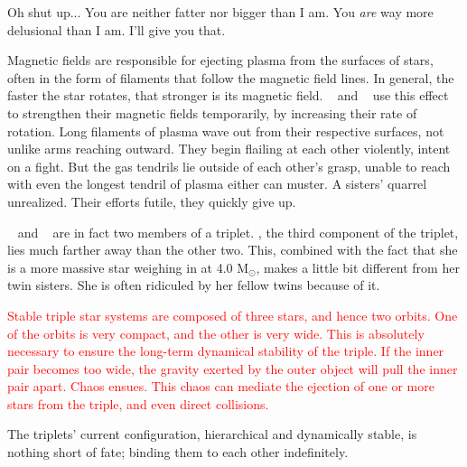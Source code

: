 \documentclass[main.tex]{subfiles}
\begin{document}
\begin{tcolorbox}[sharp corners, colback=green!30, colframe=green!80!blue, title=Stefan-Boltzmann Law]
\par \textcolor{green} {}
\end{tcolorbox}

\par \Alcyone Oh shut up...  You are neither fatter nor bigger than I am.  You \textit{are} way more delusional than I am.  I'll give you that.

\par \nar Magnetic fields are responsible for ejecting plasma from the surfaces of stars, often in the form of filaments that follow the magnetic field lines.  In general, the faster the star rotates, that stronger is its magnetic field.  \rmtaygete~ and \rmalcyone~ use this effect to strengthen their magnetic fields temporarily, by increasing their rate of rotation.  Long filaments of plasma wave out from their respective surfaces, not unlike arms reaching outward.  They begin flailing at each other violently, intent on a fight.  But the gas tendrils lie outside of each other's grasp, unable to reach with even the longest tendril of plasma either can muster.  A sisters' quarrel unrealized.  Their efforts futile, they quickly give up.  

\par \nar \rmtaygete~ and \rmalcyone~ are in fact two members of a triplet.  \rmcelaeno, the third component of the triplet, lies much farther away than the other two.  This, combined with the fact that she is a more massive star weighing in at 4.0 M$_{\odot}$, makes \rmcelaeno a little bit different from her twin sisters.  She is often ridiculed by her fellow twins because of it.

\begin{tcolorbox}[sharp corners, colback=red!30, colframe=red!80!blue, title=Dynamical Stability]
\par \textcolor{red} {Stable triple star systems are composed of three stars, and hence two orbits.  One of the orbits is very compact, and the other is very wide.  This is absolutely necessary to ensure the long-term dynamical stability of the triple.  If the inner pair becomes too wide, the gravity exerted by the outer object will pull the inner pair apart.  Chaos ensues.  This chaos can mediate the ejection of one or more stars from the triple, and even direct collisions.}  
\end{tcolorbox}

\par \nar The triplets' current configuration, hierarchical and dynamically stable, is nothing short of fate; binding them to each other indefinitely.
\end{document}
